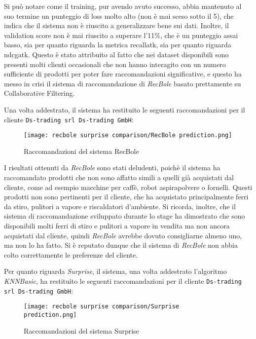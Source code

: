 Si può notare come il training, pur avendo avuto successo, abbia mantenuto al suo termine un punteggio di loss molto alto (non è mai sceso sotto il 5), che indica che il sistema non è riuscito a generalizzare bene sui dati. Inoltre, il validation score non è mai riuscito a superare l'11\%, che è un punteggio assai basso, sia per quanto riguarda la metrica \gls{recallatk}, sia per quanto riguarda \gls{ndcgatk}. Questo è stato attribuito al fatto che nei dataset disponibili sono presenti molti clienti occasionali che non hanno interagito con un numero sufficiente di prodotti per poter fare raccomandazioni significative, e questo ha messo in crisi il sistema di raccomandazione di \emph{RecBole} basato prettamente su Collaborative Filtering.

Una volta addestrato, il sistema ha restituito le seguenti raccomandazioni per il cliente \texttt{Ds-trading srl Ds-trading GmbH}:

\begin{figure}[h]
    \centering
    \texttt{[image: recbole surprise comparison/RecBole prediction.png]}
    \caption{Raccomandazioni del sistema RecBole}
    \label{fig:recbole-recommendations}
\end{figure}

I risultati ottenuti da \emph{RecBole} sono stati deludenti, poichè il sistema ha raccomandato prodotti che non sono affatto simili a quelli già acquistati dal cliente, come ad esempio macchine per caffè, robot aspirapolvere o fornelli. Questi prodotti non sono pertinenti per il cliente, che ha acquistato principalmente ferri da stiro, pulitori a vapore e riscaldatori d'ambiente. Si ricorda, inoltre, che il sistema di raccomandazione sviluppato durante lo stage ha dimostrato che sono disponibili molti ferri di stiro e pulitori a vapore in vendita ma non ancora acquistati dal cliente, quindi \emph{RecBole} avrebbe dovuto consigliarne almeno uno, ma non lo ha fatto. Si è reputato dunque che il sistema di \emph{RecBole} non abbia colto correttamente le preferenze del cliente.

Per quanto riguarda \emph{Surprise}, il sistema, una volta addestrato l'algoritmo \emph{KNNBasic}, ha restituito le seguenti raccomandazioni per il cliente \texttt{Ds-trading srl Ds-trading GmbH}:

\begin{figure}[h]
    \centering
    \texttt{[image: recbole surprise comparison/Surprise prediction.png]}
    \caption{Raccomandazioni del sistema Surprise}
    \label{fig:surprise-recommendations}
\end{figure}

